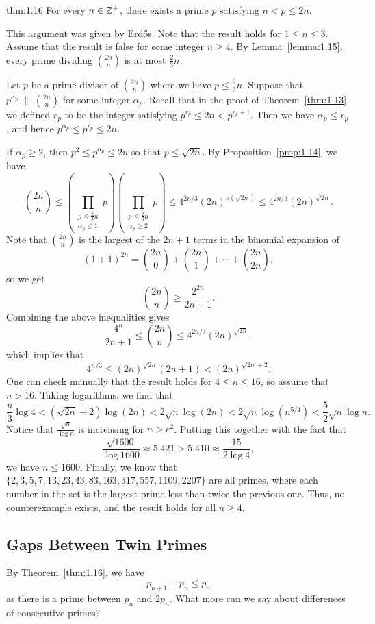 \begin{theo}[Chebyshev]{thm:1.16}
For every $n \in \mathbb{Z}^+$, there exists a prime $p$ satisfying $n < p \leq 2n$. 
\end{theo}
\begin{pf}
This argument was given by Erd\H{o}s. Note that the result holds for $1 \leq n \leq 3$. Assume that the 
result is false for some integer $n \geq 4$. By Lemma~\ref{lemma:1.15}, every prime dividing 
$\binom{2n}n$ is at most $\frac23n$. 

Let $p$ be a prime divisor of $\binom{2n}n$ where we have $p \leq \frac23n$. Suppose that 
$p^{\alpha_p} \;\|\; \binom{2n}n$ for some integer $\alpha_p$. Recall that in the proof of 
Theorem~\ref{thm:1.13}, we defined $r_p$ to be the integer satisfying $p^{r_p} \leq 2n < p^{r_p+1}$. 
Then we have $\alpha_p \leq r_p$, and hence $p^{\alpha_p} \leq p^{r_p} \leq 2n$. 

If $\alpha_p \geq 2$, then $p^2 \leq p^{\alpha_p} \leq 2n$ so that $p \leq \sqrt{2n}$. By 
Proposition~\ref{prop:1.14}, we have 
\[ \binom{2n}n \leq \left( \prod_{\substack{p\leq\frac23n\\ \alpha_p\leq 1}} p \right) 
\left( \prod_{\substack{p\leq\frac23n\\ \alpha_p\geq 2}} p \right) \leq 4^{2n/3} (2n)^{\pi(\sqrt{2n})}
\leq 4^{2n/3} (2n)^{\sqrt{2n}}. \]
Note that $\binom{2n}n$ is the largest of the $2n+1$ terms in the binomial expansion of 
\[ (1+1)^{2n} = \binom{2n}0 + \binom{2n}1 + \cdots + \binom{2n}{2n}, \]
so we get 
\[ \binom{2n}n \geq \frac{2^{2n}}{2n+1}. \]
Combining the above inequalities gives 
\[ \frac{4^n}{2n+1} \leq \binom{2n}n \leq 4^{2n/3} (2n)^{\sqrt{2n}}, \]
which implies that 
\[ 4^{n/3} \leq (2n)^{\sqrt{2n}} (2n+1) < (2n)^{\sqrt{2n}+2}. \]
One can check manually that the result holds for $4 \leq n \leq 16$, so assume that $n > 16$. Taking 
logarithms, we find that 
\[ \frac{n}3 \log 4 < (\sqrt{2n}+2)\log(2n) < 2\sqrt n \log(2n) < 2\sqrt n \log(n^{5/4}) < \frac52 \sqrt n \log n. \]
Notice that $\frac{\sqrt n}{\log n}$ is increasing for 
$n > e^2$. Putting this together with the fact that 
\[ \frac{\sqrt{1600}}{\log 1600} \approx 5.421 > 5.410 \approx \frac{15}{2\log4}, \]
we have $n \leq 1600$. Finally, we know that $\{2, 3, 5, 7, 13, 23, 43, 83, 163, 317, 557, 1109, 2207\}$
are all primes, where each number in the set is the largest prime less than twice the previous one. 
Thus, no counterexample exists, and the result holds for all $n \geq 4$.
\end{pf}

\subsection{Gaps Between Twin Primes}
By Theorem~\ref{thm:1.16}, we have 
\[ p_{n+1} - p_n \leq p_n \]
as there is a prime between $p_n$ and $2p_n$. What more can we say about differences of consecutive primes?

